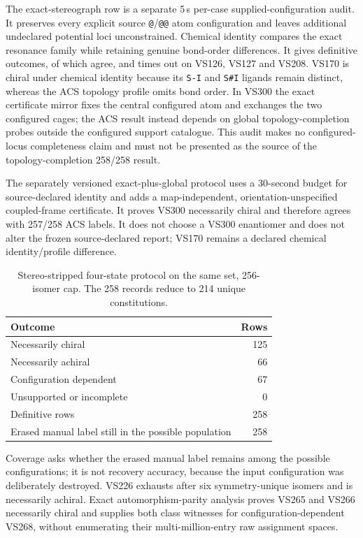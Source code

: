 \documentclass[pdflatex,sn-mathphys-num,referee,lineno]{sn-jnl}
\newcommand{\code}[1]{\texttt{#1}}
\theoremstyle{plain}
\theoremstyle{remark}
\theoremstyle{definition}
\begin{document}
The exact-stereograph row is a separate 5\,s per-case supplied-configuration audit.
It preserves every explicit source \code{@}/\code{@@} atom configuration and
leaves additional undeclared potential loci unconstrained. Chemical identity
compares the exact resonance family while retaining genuine bond-order
differences. It gives \AcsSourceDefinitive{} definitive outcomes, of which
\AcsSourceCorrect{} agree, and times out on VS126, VS127 and VS208. VS170 is chiral
under chemical identity because
its \code{S-I} and \code{S\#I} ligands remain distinct, whereas the ACS topology profile
omits bond order. In VS300 the exact certificate mirror fixes the central
configured atom and exchanges the two configured cages; the ACS result instead
depends on global topology-completion probes outside the configured support
catalogue.
This audit makes no configured-locus completeness claim and must not be
presented as the source of the topology-completion 258/258 result.

The separately versioned exact-plus-global protocol uses a 30-second budget
for source-declared identity and adds a map-independent, orientation-unspecified
coupled-frame certificate.  It proves VS300 necessarily chiral and therefore
agrees with 257/258 ACS labels.  It does not choose a VS300 enantiomer and does
not alter the frozen source-declared report; VS170 remains a declared chemical
identity/profile difference.

\begin{table}[htbp]
\caption{Stereo-stripped four-state protocol on the same set, 256-isomer cap.
The 258 records reduce to 214 unique constitutions.}
\label{tab:si-fourstate}
\centering
\begin{tabularx}{\textwidth}{@{}Xr@{}}
\toprule
Outcome & Rows \\
\midrule
Necessarily chiral & 125 \\
Necessarily achiral & 66 \\
Configuration dependent & 67 \\
Unsupported or incomplete & 0 \\
\midrule
Definitive rows & 258 \\
Erased manual label still in the possible population & 258 \\
\bottomrule
\end{tabularx}
\end{table}

Coverage asks whether the erased manual label remains among the possible
configurations; it is not recovery accuracy, because the input configuration was
deliberately destroyed.  VS226 exhausts after six symmetry-unique isomers and
is necessarily achiral.  Exact automorphism-parity analysis proves VS265 and
VS266 necessarily chiral and supplies both class witnesses for
configuration-dependent VS268, without enumerating their multi-million-entry
raw assignment spaces.
\end{document}

